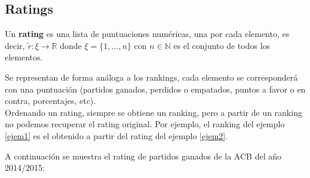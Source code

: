 \subsection{Ratings}
\begin{defi} 
	Un \textbf{rating} es una lista de puntuaciones numéricas, una por cada elemento, es decir, $\tilde{r}: \xi \rightarrow \mathbb{R}$ donde $\xi = \{1,...,n\}$ con $n \in \mathbb{N}$ es el conjunto de todos los elementos.
\end{defi}
Se representan de forma análoga a los rankings, cada elemento se corresponderá con una puntuación (partidos ganados, perdidos o empatados, puntos a favor o en contra, porcentajes, etc).\\

Ordenando un rating, siempre se obtiene un ranking, pero a partir de un ranking no podemos recuperar el rating original. Por ejemplo, el ranking del ejemplo \ref{ejem1} es el obtenido a partir del rating del ejemplo \ref{ejem2}.

\newpage  
 
\begin{ejem} \label{ejem2}
 A continuación se muestra el rating de partidos ganados de la ACB del año 2014/2015:
\end{ejem}
	

